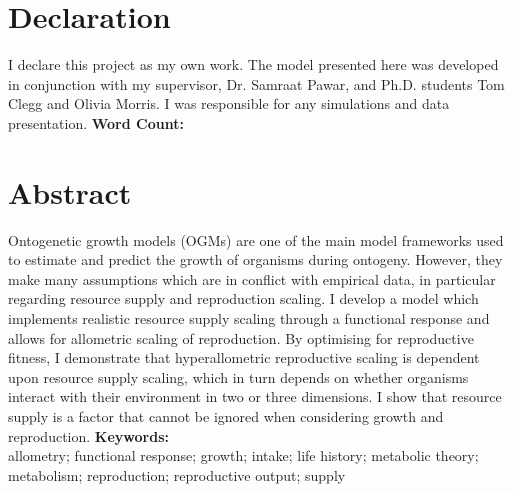 \documentclass[a4paper, 11pt, hidelinks]{article} %
\newcommand\wordcount{} %
\begin{document}
	
	

	\section*{Declaration}
	I declare this project as my own work.  The model presented here was developed in conjunction with my supervisor, Dr. Samraat Pawar, and Ph.D. students Tom Clegg and Olivia Morris.  I was responsible for any simulations and data presentation.\newline
	\textbf{Word Count: \wordcount}

	\newpage
	
	\section*{Abstract}
	Ontogenetic growth models (OGMs) are one of the main model frameworks used to estimate and predict the growth of organisms during ontogeny.  However, they make many assumptions which are in conflict with empirical data, in particular regarding resource supply and reproduction scaling.  
%	
%	
	I develop a model which implements realistic resource supply scaling through a functional response and allows for allometric scaling of reproduction.  By optimising for reproductive fitness, I demonstrate that hyperallometric reproductive scaling is dependent upon resource supply scaling, which in turn depends on whether organisms interact with their environment in two or three dimensions.  I show that resource supply is a factor that cannot be ignored when considering growth and reproduction.
%	
	\vspace*{0.5 cm}
	\newline
	\textbf{Keywords:}\\
	allometry; functional response; growth; intake; life history; metabolic theory; metabolism; reproduction; reproductive output; supply
	
\end{document}

